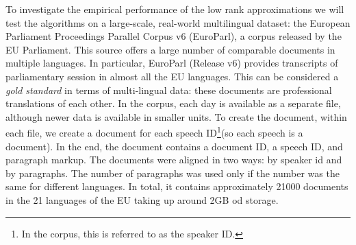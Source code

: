 \documentclass{article} %
\begin{document}
To investigate the empirical performance of the low rank
approximations we will test the algorithms on a large-scale,
real-world multilingual dataset: the European Parliament
Proceedings Parallel Corpus v6
(EuroParl)\cite{euro_parl_web}, a corpus released by the
EU Parliament. This source offers a large number of comparable
documents in multiple languages.  In particular, EuroParl
(Release v6) provides transcripts of parliamentary session in
almost all the EU languages. This can be considered a \emph{gold
  standard} in terms of multi-lingual data: these documents are
professional translations of each other.   In the
corpus, each day is available as a separate file, although newer
data is available in smaller units. To create the document,
within each file, we create a document for each speech
ID\footnote{In the corpus, this is referred to as the speaker
  ID.}(so each speech is a document). In the end, the document
contains a document ID, a speech ID, and paragraph markup. The
documents were aligned in two ways: by speaker id and by
paragraphs.  The number of paragraphs was used only if the number
was the same for different languages.  In total, it contains
approximately 21000 documents in the 21 languages of the EU
taking up around 2GB od storage.
\end{document}
